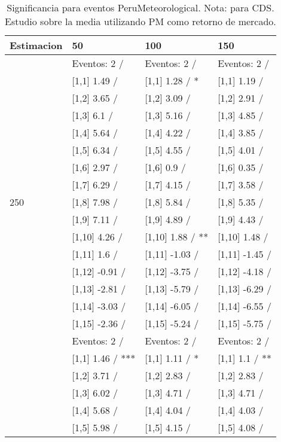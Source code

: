 \begin{table}

\caption{Significancia para eventos PeruMeteorological. Nota: para CDS. Estudio sobre la media utilizando PM como retorno de mercado.}
\centering
\begin{tabular}[t]{llll}
\toprule
Estimacion & 50 & 100 & 150\\
\midrule
 & Eventos:  2 / & Eventos:  2 / & Eventos:  2 /\\
 & {}[1,1] 1.49  / & {}[1,1] 1.28  / * & {}[1,1] 1.19  /\\
 & {}[1,2] 3.65  / & {}[1,2] 3.09  / & {}[1,2] 2.91  /\\
 & {}[1,3] 6.1  / & {}[1,3] 5.16  / & {}[1,3] 4.85  /\\
 & {}[1,4] 5.64  / & {}[1,4] 4.22  / & {}[1,4] 3.85  /\\
\addlinespace
 & {}[1,5] 6.34  / & {}[1,5] 4.55  / & {}[1,5] 4.01  /\\
 & {}[1,6] 2.97  / & {}[1,6] 0.9  / & {}[1,6] 0.35  /\\
 & {}[1,7] 6.29  / & {}[1,7] 4.15  / & {}[1,7] 3.58  /\\
250 & {}[1,8] 7.98  / & {}[1,8] 5.84  / & {}[1,8] 5.35  /\\
 & {}[1,9] 7.11  / & {}[1,9] 4.89  / & {}[1,9] 4.43  /\\
\addlinespace
 & {}[1,10] 4.26  / & {}[1,10] 1.88  / ** & {}[1,10] 1.48  /\\
 & {}[1,11] 1.6  / & {}[1,11] -1.03  / & {}[1,11] -1.45  /\\
 & {}[1,12] -0.91  / & {}[1,12] -3.75  / & {}[1,12] -4.18  /\\
 & {}[1,13] -2.81  / & {}[1,13] -5.79  / & {}[1,13] -6.29  /\\
 & {}[1,14] -3.03  / & {}[1,14] -6.05  / & {}[1,14] -6.55  /\\
\addlinespace
 & {}[1,15] -2.36  / & {}[1,15] -5.24  / & {}[1,15] -5.75  /\\
 & Eventos:  2 / & Eventos:  2 / & Eventos:  2 /\\
 & {}[1,1] 1.46  / *** & {}[1,1] 1.11  / * & {}[1,1] 1.1  / **\\
 & {}[1,2] 3.71  / & {}[1,2] 2.83  / & {}[1,2] 2.83  /\\
 & {}[1,3] 6.02  / & {}[1,3] 4.71  / & {}[1,3] 4.71  /\\
\addlinespace
 & {}[1,4] 5.68  / & {}[1,4] 4.04  / & {}[1,4] 4.03  /\\
 & {}[1,5] 5.98  / & {}[1,5] 4.15  / & {}[1,5] 4.08  /\\

\end{tabular}
\end{table}
